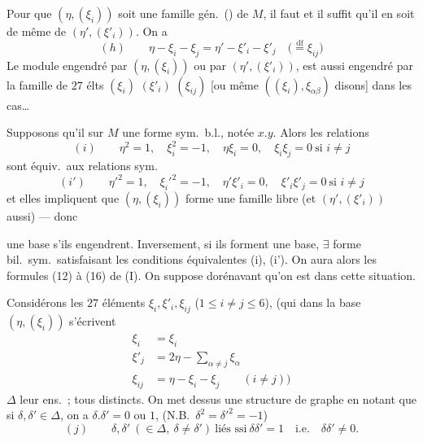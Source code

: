 \documentclass[11pt,a4paper]{article}
\begin{document}
Pour que $(\eta, (\xi_i))$ soit une famille gén.\ () de
$M$, il faut et il suffit qu'il en soit de même de $(\eta', (\xi'_i))$.
 On a
\[
(h) \qquad \eta - \xi_i - \xi_j = \eta' - \xi'_i - \xi'_j
\quad \bigl(\overset{\text{df}}{=} \xi_{ij}\bigr)
\]
Le module engendré par \struck{\ill{} \ill{}} $(\eta, (\xi_i))$ ou par
$(\eta', (\xi'_i))$, est aussi engendré par la famille de $27$ élts
$(\xi_i)$ $(\xi'_i)$ $(\xi_{ij})$ [ou même $((\xi_i), \xi_{\alpha\beta})$
disons] dans les cas…

Supposons qu'il   sur $M$ une forme sym.\ b.l.,
notée $x.y$.  Alors les relations
\[
(i) \qquad \eta^2 = 1, \quad \xi_i^2 = -1, \quad \eta\xi_i = 0, \quad
\xi_i\xi_j = 0 \ \text{si } i \neq j
\]
sont équiv.\ aux relations sym.
\[
(i') \qquad \eta'^2 = 1, \quad \xi_i'^2 = -1, \quad \eta'\xi'_i = 0, \quad
\xi'_i\xi'_j = 0 \ \text{si } i \neq j
\]
et elles impliquent que $(\eta, (\xi_i))$ forme une famille libre (et
$(\eta', (\xi'_i))$ aussi) — donc

une base s'ils \struck{\ill{}}  engendrent. Inversement, si
ils forment une base, $\exists$ forme bil.\ sym.\ satisfaisant les
conditions équivalentes (i), (i'). On aura alors les formules (12) à (16) de
(I). On suppose dorénavant qu'on est dans cette situation.

Considérons les $27$ éléments $\xi_i, \xi'_i, \xi_{ij}$ ($1 \leq i \neq j
\leq 6$), (qui dans la base $(\eta, (\xi_i))$ s'écrivent
\[
\begin{aligned}
\xi_i &= \xi_i \\
\xi'_j &= 2\eta - \sum_{\alpha \neq j} \xi_\alpha \\
\xi_{ij} &= \eta - \xi_i - \xi_j \qquad (i \neq j) \bigr)
\end{aligned}
\]
 \struck{\ill{}} $\Delta$ leur ens.\ ; 
tous distincts. On met dessus une structure de graphe en notant
\struck{\ill{}} que si $\delta, \delta' \in \Delta$,  on a $\delta . \delta' = 0$ ou $1$, (N.B.\ $\delta^2 = \delta'^2
= -1$) 
\[
(j) \qquad \delta, \delta' \ (\in \Delta, \ \delta \neq \delta') \ \text{liés
ssi} \ \delta\delta' = 1 \quad \text{i.e.} \quad \delta\delta' \neq 0 .
\]
\end{document}

